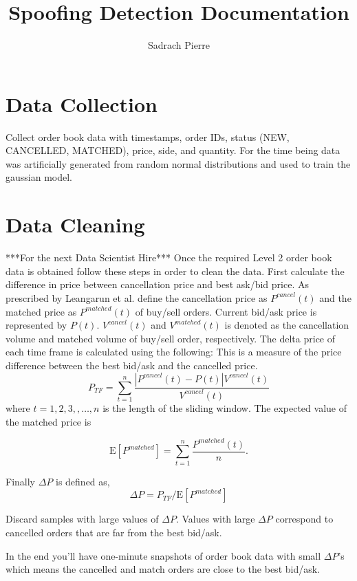 \documentclass[12pt]{article}
\title{Spoofing Detection Documentation}
\author{Sadrach Pierre}
\begin{document}
\maketitle

\section{Data Collection}
Collect order book data with timestamps, order IDs, status (NEW, CANCELLED, MATCHED), price, side, and quantity. For the time being data was artificially generated from random normal distributions and used to train the gaussian model. 

\section{Data Cleaning}
***For the next Data Scientist Hire***
Once the required Level 2 order book data is obtained follow these steps in order to clean the data. 
First calculate the difference in price between cancellation price and best ask/bid price. As prescribed by Leangarun et al. define the cancellation price as $P^{cancel}(t)$ and the matched price as $P^{matched}(t)$ of buy/sell orders. Current bid/ask price is represented by $P(t)$. $V^{cancel}(t)$ and $V^{matched}(t)$ is denoted as the cancellation volume and matched volume of buy/sell order, respectively. 
The delta price of each time frame is calculated using the following:
This is a measure of the price difference between the best bid/ask and the cancelled price. 
\begin{equation}
P_{TF} = \sum_{t=1}^{n} \frac{|P^{cancel}(t)- P(t)|V^{cancel}(t)}{V^{cancel}(t)}
\end{equation}
where $t= {1,2,3,, \dots, n}$ is the length of the sliding window. 
The expected value of the matched price is

\begin{equation}
\textrm{E}[P^{matched}] = \sum_{t=1}^{n} \frac{P^{matched}(t)}{n}.
\end{equation}

Finally $\Delta P$ is defined as,
\begin{equation}
\Delta P  = P_{TF}/\textrm{E}[P^{matched}]
\end{equation}

Discard samples with large values of $\Delta P$. Values with large $\Delta P$ correspond to cancelled orders that are far from the best bid/ask. 

In the end you'll have one-minute snapshots of order book data with small $\Delta P$'s which means the cancelled and match orders are close to the best bid/ask. 
\end{document}
